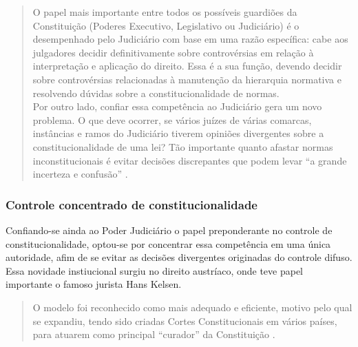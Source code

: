 \documentclass{article}
\begin{document}
\begin{quote}
    O papel mais importante entre todos os possíveis guardiões da Constituição (Poderes Executivo, Legislativo ou Judiciário) é o desempenhado pelo Judiciário com base em uma razão específica: cabe aos julgadores decidir definitivamente sobre controvérsias em relação à interpretação e aplicação do direito. Essa é a sua função, devendo decidir sobre controvérsias relacionadas à manutenção da hierarquia normativa e resolvendo dúvidas sobre a constitucionalidade de normas.\\
    Por outro lado, confiar essa competência ao Judiciário gera um novo problema. O que deve ocorrer, se vários juízes de várias comarcas, instâncias e ramos do Judiciário tiverem opiniões divergentes sobre a constitucionalidade de uma lei? Tão importante quanto afastar normas inconstitucionais é evitar decisões discrepantes que podem levar “a grande incerteza e confusão”  \cite[p.~25]{dimoulis_curso_2016}.
\end{quote}

\subsubsection{Controle concentrado de constitucionalidade}

Confiando-se ainda ao Poder Judiciário o papel preponderante no controle de constitucionalidade, optou-se por concentrar essa competência em uma única autoridade, afim de se evitar as decisões divergentes originadas do controle difuso. Essa novidade instiucional surgiu no direito austríaco, onde teve papel importante o famoso jurista Hans Kelsen.

\begin{quote}
    O modelo foi reconhecido como mais adequado e eficiente, motivo pelo qual se expandiu, tendo sido criadas Cortes Constitucionais em vários países, para atuarem como principal “curador” da Constituição \cite[p.~25]{dimoulis_curso_2016}.
\end{quote}

\printbibliography
\end{document}
